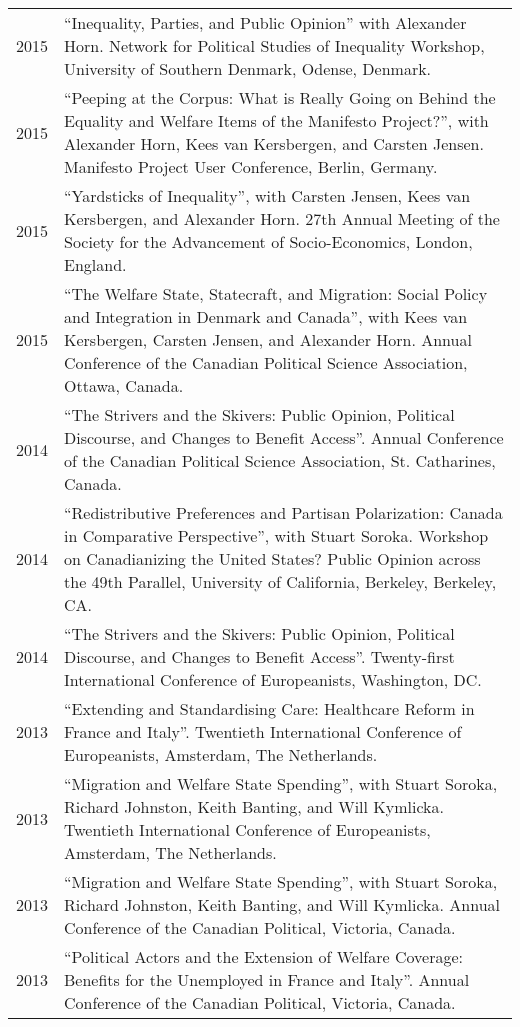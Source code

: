\documentclass[letterpaper,fontsize=10pt]{scrartcl}
\begin{document}
\begin{tabularx}{\textwidth}{@{} l X @{} }
			2015 & ``Inequality, Parties, and Public Opinion'' with Alexander Horn. Network for Political Studies of Inequality Workshop, University of Southern Denmark, Odense, Denmark.\\[1ex]
			2015 & ``Peeping at the Corpus: What is Really Going on Behind the Equality and Welfare Items of the Manifesto Project?'', with Alexander Horn, Kees van Kersbergen, and Carsten Jensen. Manifesto Project User Conference, Berlin, Germany.\\[1ex]
			2015 & ``Yardsticks of Inequality'', with Carsten Jensen, Kees van Kersbergen, and Alexander Horn. 27th Annual Meeting of the Society for the Advancement of Socio-Economics, London, England.\\[1ex]
			2015 & ``The Welfare State, Statecraft, and Migration: Social Policy and Integration in Denmark and Canada'', with Kees van Kersbergen, Carsten Jensen, and Alexander Horn. Annual Conference of the Canadian Political Science Association, Ottawa, Canada.\\[1ex]
			2014 & ``The Strivers and the Skivers: Public Opinion, Political Discourse, and Changes to Benefit Access''. Annual Conference of the Canadian Political Science Association, St. Catharines, Canada.\\[1ex]
			2014 & ``Redistributive Preferences and Partisan Polarization: Canada in Comparative Perspective'', with Stuart Soroka. Workshop on Canadianizing the United States? Public Opinion across the 49th Parallel, University of California, Berkeley, Berkeley, CA.\\[1ex]
			2014 & ``The Strivers and the Skivers: Public Opinion, Political Discourse, and Changes to Benefit Access''. Twenty-first International Conference of Europeanists, Washington, DC.\\[1ex]
			2013 & ``Extending and Standardising Care: Healthcare Reform in France and Italy''. Twentieth International Conference of Europeanists, Amsterdam, The Netherlands.\\[1ex]
			2013 & ``Migration and Welfare State Spending'', with Stuart Soroka, Richard Johnston, Keith Banting, and Will Kymlicka. Twentieth International Conference of Europeanists, Amsterdam, The Netherlands.\\[1ex]
			2013 & ``Migration and Welfare State Spending'', with Stuart Soroka, Richard Johnston, Keith Banting, and Will Kymlicka. Annual Conference of the Canadian Political, Victoria, Canada.\\[1ex]
			2013 & ``Political Actors and the Extension of Welfare Coverage: Benefits for the Unemployed in France and Italy''. Annual Conference of the Canadian Political, Victoria, Canada.
		\end{tabularx}
\end{document}
